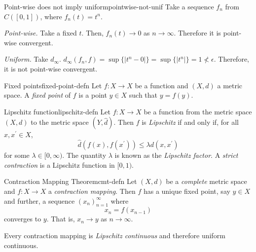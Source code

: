 \documentclass{article}
\numberwithin{equation}{section}
\numberwithin{figure}{section}
\begin{document}
\begin{example}{Point-wise does not imply uniform}{pointwise-not-unif}
    Take a sequence $f_n$ from $C([0,1])$, where $f_n(t) =t^n$.

    \emph{Point-wise.} Take a fixed $t$. Then, $f_n(t) \to 0$ as $n \to \infty$. Therefore it is point-wise convergent.

    \emph{Uniform.} Take $d_\infty$. $d_\infty(f_n,f)=\sup\{|t^n-0|\}=\sup\{|t^n|\} = 1 \not< \epsilon$. Therefore, it is not point-wise convergent.
\end{example}
\begin{definition}{Fixed points}{fixed-point-defn}
    Let $f:X\to X$ be a function and $(X,d)$ a metric space. A \emph{fixed point} of $f$ is a point $y\in X$ such that $y=f(y)$.
\end{definition}
\begin{definition}{Lipschitz function}{lipschitz-defn}
    Let $f:X\to X$ be a function from the metric space $(X,d)$ to the metric space $(Y,\hat{d})$. Then $f$ is \emph{Lipschitz} if and only if, for all $x, x^\prime \in X$,
    \begin{equation}
        \hat{d}(f(x),f(x^\prime)) \leq \lambda d(x,x^\prime)
    \end{equation}
    for some $\lambda\in[0,\infty)$. The quantity $\lambda$ is known as the \emph{Lipschitz factor}. A \emph{strict contraction} is a Lipschitz function in $[0,1)$.
\end{definition}
\begin{definition}{Contraction Mapping Theorem}{cmt-defn}
    Let $(X,d)$ be a \emph{complete} metric space and $f:X \to X$ a \emph{contraction mapping}. Then $f$ has a unique fixed point, say $y \in X$ and further, a sequence $(x_n)^\infty_{n=1}$ where 
    \begin{equation}
        x_n = f(x_{n-1})
    \end{equation}
    converges to $y$. That is, $x_n \to y$ as $n \to \infty$.

    Every contraction mapping is \emph{Lipschitz continuous} and therefore uniform continuous.
\end{definition}
\pagebreak
\end{document}
